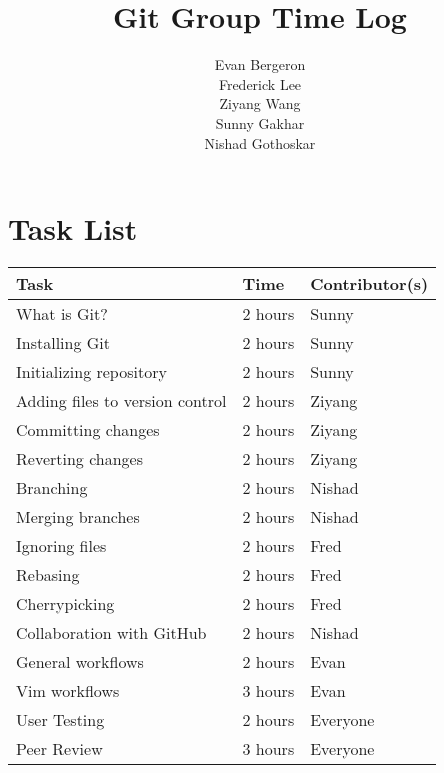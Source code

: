 \documentclass[11pt]{article}
\title{Git Group Time Log}
\author{Evan Bergeron\\
Frederick Lee\\
Ziyang Wang\\
Sunny Gakhar\\
Nishad Gothoskar}
\begin{document}
\maketitle

\section*{Task List}
\begin{center}
\begin{tabular}{lll}
Task & Time & Contributor(s)\\
\hline
What is Git? & 2 hours & Sunny \\
Installing Git & 2 hours & Sunny \\
Initializing repository & 2 hours & Sunny \\
Adding files to version control & 2 hours & Ziyang \\
Committing changes & 2 hours & Ziyang \\
Reverting changes & 2 hours & Ziyang \\
Branching & 2 hours & Nishad \\
Merging branches & 2 hours & Nishad \\
Ignoring files & 2 hours & Fred \\
Rebasing & 2 hours & Fred \\
Cherrypicking & 2 hours & Fred \\
Collaboration with GitHub & 2 hours & Nishad \\
General workflows & 2 hours & Evan \\
Vim workflows & 3 hours & Evan \\
User Testing & 2 hours & Everyone \\
Peer Review & 3 hours & Everyone \\
\end{tabular}
\end{center}
\end{document}
